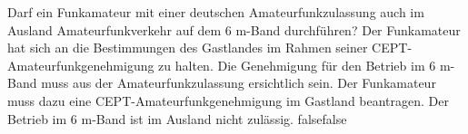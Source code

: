     {Darf ein Funkamateur mit einer deutschen Amateurfunkzulassung auch im Ausland Amateurfunkverkehr auf dem 6 m-Band durchführen?}
    {Der Funkamateur hat sich an die Bestimmungen des Gastlandes im Rahmen seiner CEPT-Amateurfunkgenehmigung zu halten.}
    {Die Genehmigung für den Betrieb im 6 m-Band muss aus der Amateurfunkzulassung ersichtlich sein.}
    {Der Funkamateur muss dazu eine CEPT-Amateurfunkgenehmigung im Gastland beantragen.}
    {Der Betrieb im 6 m-Band ist im Ausland nicht zulässig.}
    {false}{false}